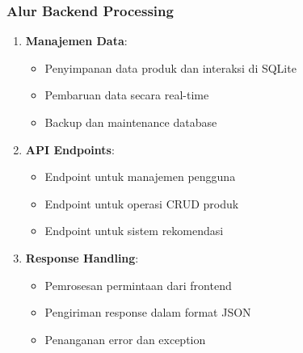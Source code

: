 \documentclass[journal,article,submit,pdftex,moreauthors]{Definitions/mdpi}
\begin{document}
\subsubsection{Alur Backend Processing}
\begin{enumerate}
    \item \textbf{Manajemen Data}:
    \begin{itemize}
        \item Penyimpanan data produk dan interaksi di SQLite
        \item Pembaruan data secara real-time
        \item Backup dan maintenance database
    \end{itemize}

    \item \textbf{API Endpoints}:
    \begin{itemize}
        \item Endpoint untuk manajemen pengguna
        \item Endpoint untuk operasi CRUD produk
        \item Endpoint untuk sistem rekomendasi
    \end{itemize}

    \item \textbf{Response Handling}:
    \begin{itemize}
        \item Pemrosesan permintaan dari frontend
        \item Pengiriman response dalam format JSON
        \item Penanganan error dan exception
    \end{itemize}
\end{enumerate}
\end{document}

